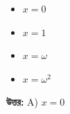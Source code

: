 \documentclass[12pt, a4paper]{article}
\begin{document}
\begin{itemize}[label={}, leftmargin=1cm, itemsep=0.5em]
    \item[\textbf{A)}] $x = 0$
    \item[\textbf{B)}] $x = 1$
    \item[\textbf{C)}] $x = \omega$
    \item[\textbf{D)}] $x = \omega^2$
\end{itemize}

\vspace{0.5em}
\begin{tcolorbox}[answerbox]
    \textbf{\color{success} উত্তর:} A) $x = 0$
\end{tcolorbox}
\vspace{1em}
\end{document}
